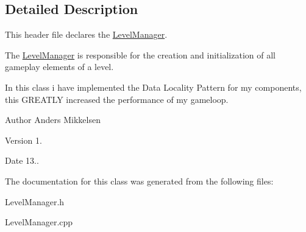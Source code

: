 \subsection{Detailed Description}
This header file declares the \hyperlink{class_level_manager}{Level\+Manager}. 

The \hyperlink{class_level_manager}{Level\+Manager} is responsible for the creation and initialization of all gameplay elements of a level.

In this class i have implemented the Data Locality Pattern for my components, this G\+R\+E\+A\+T\+L\+Y increased the performance of my gameloop.

\begin{DoxyAuthor}{Author}
Anders Mikkelsen 
\end{DoxyAuthor}
\begin{DoxyVersion}{Version}
1. 
\end{DoxyVersion}
\begin{DoxyDate}{Date}
13.. 
\end{DoxyDate}


The documentation for this class was generated from the following files\+:\begin{DoxyCompactItemize}
\item 
Level\+Manager.\+h\item 
Level\+Manager.\+cpp\end{DoxyCompactItemize}
